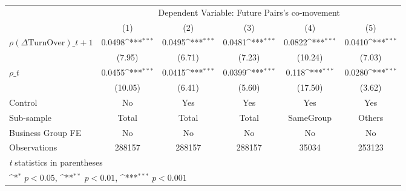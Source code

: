 {
\def\sym#1{\ifmmode^{#1}\else\(^{#1}\)\fi}
\begin{tabular}{l*{5}{c}}
\hline\hline
                &\multicolumn{5}{c}{Dependent Variable:  Future Pairs's co-movement}                           \\\cmidrule(lr){2-6}
                &\multicolumn{1}{c}{(1)}         &\multicolumn{1}{c}{(2)}         &\multicolumn{1}{c}{(3)}         &\multicolumn{1}{c}{(4)}         &\multicolumn{1}{c}{(5)}         \\
\hline
 $ {\rho(\Delta \text{TurnOver})\_{t+1}} $ &   0.0498\sym{***}&   0.0495\sym{***}&   0.0481\sym{***}&   0.0822\sym{***}&   0.0410\sym{***}\\
                &   (7.95)         &   (6.71)         &   (7.23)         &  (10.24)         &   (7.03)         \\
[1em]
 $ {\rho\_t} $   &   0.0455\sym{***}&   0.0415\sym{***}&   0.0399\sym{***}&    0.118\sym{***}&   0.0280\sym{***}\\
                &  (10.05)         &   (6.41)         &   (5.60)         &  (17.50)         &   (3.62)         \\
\hline
Control         &       No         &      Yes         &      Yes         &      Yes         &      Yes         \\
Sub-sample      &    Total         &    Total         &    Total         &SameGroup         &   Others         \\
Business Group FE&       No         &       No         &       No         &       No         &       No         \\
Observations    &   288157         &   288157         &   288157         &    35034         &   253123         \\
\hline\hline
\multicolumn{6}{l}{\footnotesize \textit{t} statistics in parentheses}\\
\multicolumn{6}{l}{\footnotesize \sym{*} \(p<0.05\), \sym{**} \(p<0.01\), \sym{***} \(p<0.001\)}\\
\end{tabular}
}
